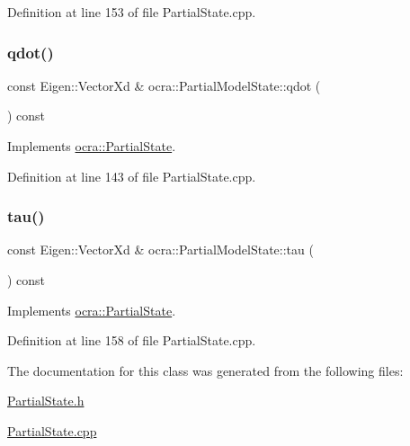 Definition at line 153 of file Partial\+State.\+cpp.

\hypertarget{classocra_1_1PartialModelState_a8707827d456a8c406d95c1cd4fc2e0b7}{}\label{classocra_1_1PartialModelState_a8707827d456a8c406d95c1cd4fc2e0b7} 
\subsubsection{\texorpdfstring{qdot()}{qdot()}}
{\footnotesize\ttfamily const Eigen\+::\+Vector\+Xd \& ocra\+::\+Partial\+Model\+State\+::qdot (\begin{DoxyParamCaption}{ }\end{DoxyParamCaption}) const\hspace{0.3cm}{\ttfamily [virtual]}}



Implements \hyperlink{classocra_1_1PartialState_a5af623db2ae7e68cb4658f226e8ae006}{ocra\+::\+Partial\+State}.



Definition at line 143 of file Partial\+State.\+cpp.

\hypertarget{classocra_1_1PartialModelState_a286258284aa61c902106a6b0fcdde9ca}{}\label{classocra_1_1PartialModelState_a286258284aa61c902106a6b0fcdde9ca} 
\subsubsection{\texorpdfstring{tau()}{tau()}}
{\footnotesize\ttfamily const Eigen\+::\+Vector\+Xd \& ocra\+::\+Partial\+Model\+State\+::tau (\begin{DoxyParamCaption}{ }\end{DoxyParamCaption}) const\hspace{0.3cm}{\ttfamily [virtual]}}



Implements \hyperlink{classocra_1_1PartialState_a875575d215c7fe9278d47ff6f392bb84}{ocra\+::\+Partial\+State}.



Definition at line 158 of file Partial\+State.\+cpp.



The documentation for this class was generated from the following files\+:\begin{DoxyCompactItemize}
\item 
\hyperlink{PartialState_8h}{Partial\+State.\+h}\item 
\hyperlink{PartialState_8cpp}{Partial\+State.\+cpp}\end{DoxyCompactItemize}
